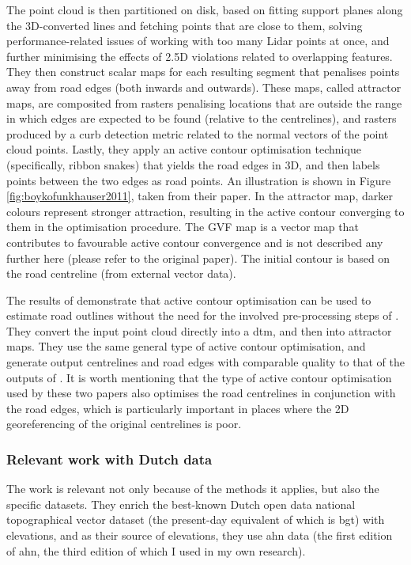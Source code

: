 The point cloud is then partitioned on disk, based on fitting support planes along the 3D-converted lines and fetching points that are close to them, solving performance-related issues of working with too many Lidar points at once, and further minimising the effects of 2.5D violations related to overlapping features. They then construct scalar maps for each resulting segment that penalises points away from road edges (both inwards and outwards). These maps, called attractor maps, are composited from rasters penalising locations that are outside the range in which edges are expected to be found (relative to the centrelines), and rasters produced by a curb detection metric related to the normal vectors of the point cloud points. Lastly, they apply an active contour optimisation technique (specifically, ribbon snakes) that yields the road edges in 3D, and then labels points between the two edges as road points. An illustration is shown in Figure \ref{fig:boykofunkhauser2011}, taken from their paper. In the attractor map, darker colours represent stronger attraction, resulting in the active contour converging to them in the optimisation procedure. The GVF map is a vector map that contributes to favourable active contour convergence and is not described any further here (please refer to the original paper). The initial contour is based on the road centreline (from external vector data).

The results of \cite{gopfert_etal_2011} demonstrate that active contour optimisation can be used to estimate road outlines without the need for the involved pre-processing steps of \cite{boyko_funkhauser_2011}. They convert the input point cloud directly into a \ac{dtm}, and then into attractor maps. They use the same general type of active contour optimisation, and generate output centrelines and road edges with comparable quality to that of the outputs of \cite{boyko_funkhauser_2011}. It is worth mentioning that the type of active contour optimisation used by these two papers also optimises the road centrelines in conjunction with the road edges, which is particularly important in places where the 2D georeferencing of the original centrelines is poor.

\subsubsection{Relevant work with Dutch data}

The work \cite{oudeElberink_vosselman_2006} is relevant not only because of the methods it applies, but also the specific datasets. They enrich the best-known Dutch open data national topographical vector dataset (the present-day equivalent of which is \ac{bgt}) with elevations, and as their source of elevations, they use \ac{ahn} data (the first edition of \ac{ahn}, the third edition of which I used in my own research).

